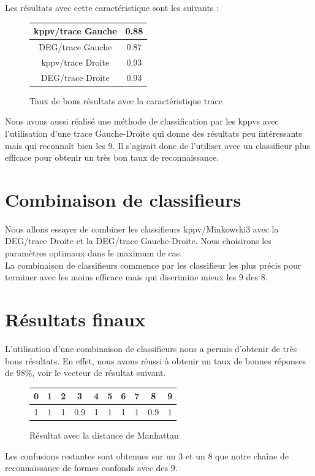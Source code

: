 Les résultats avec cette caractéristique sont les suivants :

\begin{figure}[h!]
\centering
\begin{tabular}{|*{2}{c|}}
    \hline
    kppv/trace Gauche & 0.88 \\
    \hline
    DEG/trace Gauche & 0.87 \\
    \hline
    kppv/trace Droite & 0.93 \\
    \hline
    DEG/trace Droite & 0.93 \\
    \hline
\end{tabular}
\caption{Taux de bons résultats avec la caractéristique trace}
\end{figure}

Nous avons aussi réalisé une méthode de classification par les kppvs
avec l'utilisation d'une trace Gauche-Droite qui donne des résultats 
peu intéressants mais qui reconnaît bien les 9. Il s'agirait donc de 
l'utiliser avec un classifieur plus efficace pour obtenir un très bon
taux de reconnaissance.

\section{Combinaison de classifieurs}

Nous allons essayer de combiner les classifieurs kppv/Minkowski3 avec la 
DEG/trace Droite et la DEG/trace Gauche-Droite. Nous choisirons les
paramètres optimaux dans le maximum de cas. \\
La combinaison de classifieurs commence par les classifieur les plus
précis pour terminer avec les moins efficace mais qui discrimine mieux 
les 9 des 8. \\

\section{Résultats finaux}

L'utilisation d'une combinaison de classifieurs nous a permis d'obtenir
de très bons résultats. En effet, nous avons réussi à obtenir un
taux de bonnes réponses de 98\%, voir le vecteur de résultat suivant.

\begin{figure}[h!]
\centering
\begin{tabular}{|*{10}{c|}}
    \hline
    0 & 1 & 2 & 3 & 4 & 5 & 6 & 7 & 8 & 9 \\
    \hline
    1 & 1 & 1 & 0.9 & 1 & 1 & 1 & 1 & 0.9 & 1  \\
    \hline
\end{tabular}
\caption{Résultat avec la distance de Manhattan}
\end{figure} 

Les confusions restantes sont obtenues sur un 3 et un 8 que notre
chaîne de reconnaissance de formes confonds avec des 9. 
